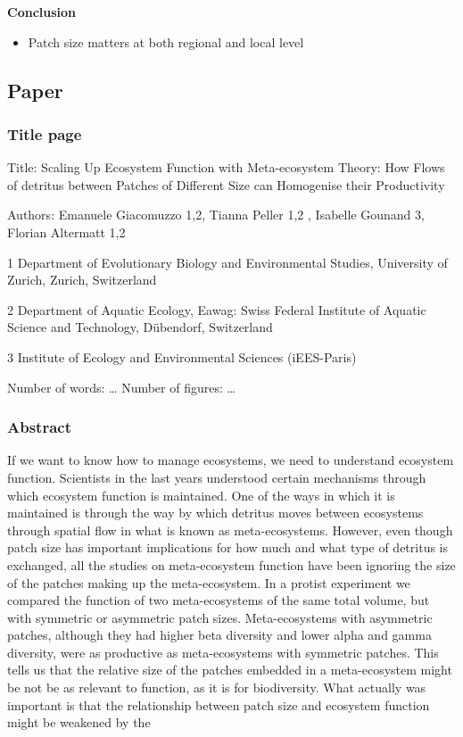 \documentclass[
]{article}
\providecommand{\tightlist}{%
  \setlength{\itemsep}{0pt}\setlength{\parskip}{0pt}}
\begin{document}
\textbf{Conclusion}

\begin{itemize}
\tightlist
\item
  Patch size matters at both regional and local level
\end{itemize}

\hypertarget{paper}{%
\subsection{Paper}\label{paper}}

\hypertarget{title-page}{%
\subsubsection{Title page}\label{title-page}}

Title: Scaling Up Ecosystem Function with Meta-ecosystem Theory: How
Flows of detritus between Patches of Different Size can Homogenise their
Productivity

Authors: Emanuele Giacomuzzo 1,2, Tianna Peller 1,2 , Isabelle Gounand
3, Florian Altermatt 1,2

1 Department of Evolutionary Biology and Environmental Studies,
University of Zurich, Zurich, Switzerland

2 Department of Aquatic Ecology, Eawag: Swiss Federal Institute of
Aquatic Science and Technology, Dübendorf, Switzerland

3 Institute of Ecology and Environmental Sciences (iEES-Paris)

Number of words: \ldots{} Number of figures: \ldots{}

\hypertarget{abstract}{%
\subsubsection{Abstract}\label{abstract}}

If we want to know how to manage ecosystems, we need to understand
ecosystem function. Scientists in the last years understood certain
mechanisms through which ecosystem function is maintained. One of the
ways in which it is maintained is through the way by which detritus
moves between ecosystems through spatial flow in what is known as
meta-ecosystems. However, even though patch size has important
implications for how much and what type of detritus is exchanged, all
the studies on meta-ecosystem function have been ignoring the size of
the patches making up the meta-ecosystem. In a protist experiment we
compared the function of two meta-ecosystems of the same total volume,
but with symmetric or asymmetric patch sizes. Meta-ecosystems with
asymmetric patches, although they had higher beta diversity and lower
alpha and gamma diversity, were as productive as meta-ecosystems with
symmetric patches. This tells us that the relative size of the patches
embedded in a meta-ecosystem might be not be as relevant to function, as
it is for biodiversity. What actually was important is that the
relationship between patch size and ecosystem function might be weakened
by the
\end{document}
